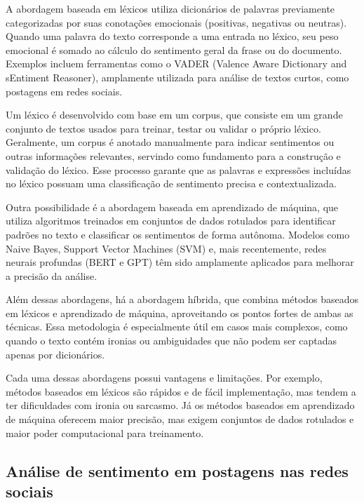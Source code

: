 \documentclass[
	12pt,				%
	oneside,			%
	a4paper,			%
	english,			%
	french,				%
	spanish,			%
	brazil				%
	]{abntex2}
\begin{document}
A abordagem baseada em léxicos utiliza dicionários de palavras
previamente categorizadas por suas conotações emocionais (positivas,
negativas ou neutras). Quando uma palavra do texto corresponde a uma
entrada no léxico, seu peso emocional é somado ao cálculo do sentimento
geral da frase ou do documento. Exemplos incluem ferramentas como o
VADER (Valence Aware Dictionary and sEntiment Reasoner), amplamente
utilizada para análise de textos curtos, como postagens em redes
sociais.

Um léxico é desenvolvido com base em um corpus, que consiste em um
grande conjunto de textos usados para treinar, testar ou validar o
próprio léxico. Geralmente, um corpus é anotado manualmente para indicar
sentimentos ou outras informações relevantes, servindo como fundamento
para a construção e validação do léxico. Esse processo garante que as
palavras e expressões incluídas no léxico possuam uma classificação de
sentimento precisa e contextualizada.

Outra possibilidade é a abordagem baseada em aprendizado de máquina, que
utiliza algoritmos treinados em conjuntos de dados rotulados para
identificar padrões no texto e classificar os sentimentos de forma
autônoma. Modelos como Naive Bayes, Support Vector Machines (SVM) e,
mais recentemente, redes neurais profundas (BERT e GPT) têm sido
amplamente aplicados para melhorar a precisão da análise.

Além dessas abordagens, há a abordagem híbrida, que combina métodos
baseados em léxicos e aprendizado de máquina, aproveitando os pontos
fortes de ambas as técnicas. Essa metodologia é especialmente útil em
casos mais complexos, como quando o texto contém ironias ou ambiguidades
que não podem ser captadas apenas por dicionários.

Cada uma dessas abordagens possui vantagens e limitações. Por exemplo,
métodos baseados em léxicos são rápidos e de fácil implementação, mas
tendem a ter dificuldades com ironia ou sarcasmo. Já os métodos baseados
em aprendizado de máquina oferecem maior precisão, mas exigem conjuntos
de dados rotulados e maior poder computacional para treinamento.

\hypertarget{anuxe1lise-de-sentimento-em-postagens-nas-redes-sociais}{%
\subsection{Análise de sentimento em postagens nas redes
sociais}\label{anuxe1lise-de-sentimento-em-postagens-nas-redes-sociais}}
\end{document}
